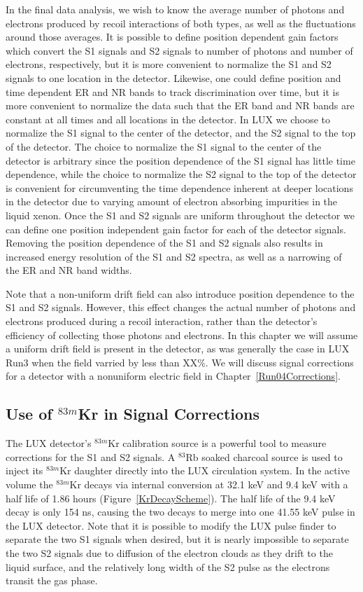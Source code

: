 In the final data analysis, we wish to know the average number of photons and electrons produced by recoil interactions of both types, as well as the fluctuations around those averages.  It is possible to define position dependent gain factors which convert the S1 signals and S2 signals to number of photons and number of electrons, respectively, but it is more convenient to normalize the S1 and S2 signals to one location in the detector.   Likewise, one could define position and time dependent ER and NR bands to track discrimination over time, but it is more convenient to normalize the data such that the ER band and NR bands are constant at all times and all locations in the detector.  In LUX we choose to normalize the S1 signal to the center of the detector, and the S2 signal to the top of the detector.  The choice to normalize the S1 signal to the center of the detector is arbitrary since the position dependence of the S1 signal has little time dependence, while the choice to normalize the S2 signal to the top of the detector is convenient for circumventing the time dependence inherent at deeper locations in the detector due to varying amount of electron absorbing impurities in the liquid xenon.  Once the S1 and S2 signals are uniform throughout the detector we can define one position independent gain factor for each of the detector signals.  Removing the position dependence of the S1 and S2 signals also results in increased energy resolution of the S1 and S2 spectra, as well as a narrowing of the ER and NR band widths.


Note that a non-uniform drift field can also introduce position dependence to the S1 and S2 signals.  However, this effect changes the actual number of photons and electrons produced during a recoil interaction, rather than the detector's efficiency of collecting those photons and electrons.  In this chapter we will assume a uniform drift field is present in the detector, as was generally the case in LUX Run3 when the field varried by less than XX\%. We will discuss signal corrections for a detector with a nonuniform electric field in Chapter~\ref{Run04Corrections}.

\subsection{Use of $^{83m}$Kr in Signal Corrections} \label{KrSource}

The LUX detector's $^{83m}$Kr calibration source is a powerful tool to measure corrections for the S1 and S2 signals. A $^{83}$Rb soaked charcoal source is used to inject its $^{83m}$Kr daughter directly into the LUX circulation system.  In the active volume the $^{83m}$Kr decays via internal conversion at 32.1 keV and 9.4 keV with a half life of 1.86 hours (Figure~\ref{KrDecayScheme}).  The half life of the 9.4 keV decay is only 154 ns, causing the two decays to merge into one 41.55 keV pulse in the LUX detector.  Note that it is possible to modify the LUX pulse finder to separate the two S1 signals when desired, but it is nearly impossible to separate the two S2 signals due to diffusion of the electron clouds as they drift to the liquid surface, and the relatively long width of the S2 pulse as the electrons transit the gas phase.

